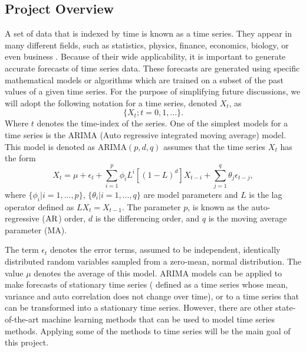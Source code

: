 \documentclass[10pt,a4paper]{article}
\begin{document}
\subsection{Project Overview}\label{sec: overview}
%
A set of data that is indexed by time is known as a time series. They appear in many different fields, such as statistics, physics, finance, economics, biology, or even business \cite{Adhikari_2013}. Because of their wide applicability, it is important to generate accurate forecasts of time series data. These forecasts are generated using specific mathematical models or algorithms which are trained on a subset of the past values of a given time series. For the purpose of simplifying future discussions, we will adopt the following notation for a time series, denoted $X_t$, as
\begin{equation}
\lbrace X_t; t=0,1,... \rbrace.
\end{equation}
Where $t$ denotes the time-index of the series. One of the simplest models for a time series is the ARIMA (Auto regressive integrated moving average) model. This model is denoted as ARIMA$(p,d,q)$ assumes that the time series $X_t$ has the form
\begin{equation}
X_{t} = \mu +\epsilon_t+ \sum_{i=1}^p \phi_i L^i \left[ (1-L)^d \right] X_{t-i} + \sum_{j=1}^q \theta_j \epsilon_{t-j},
\end{equation}  
where $\lbrace \phi_i | i=1,...,p \rbrace$, $\lbrace \theta_i | i=1,...,q \rbrace$ are model parameters and $L$ is the lag operator defined as $L X_t = X_{t-1} $. The parameter $p$, is known as the auto-regressive (${\rm AR}$) order, $d$ is the differencing order, and $q$ is the moving average parameter (MA). 

The term $\epsilon_{t}$ denotes the error terms, assumed to be independent, identically distributed random variables sampled from a zero-mean, normal distribution. The value $\mu$ denotes the average of this model. ARIMA models can be applied to make forecasts of stationary time series ( defined as a time series whose mean, variance and auto correlation does not change over time), or to a time series that can be transformed into a stationary time series. However, there are other state-of-the-art machine learning methods that can be used to model time series methods. Applying some of the methods to time series will be the main goal of this project.
\end{document}

